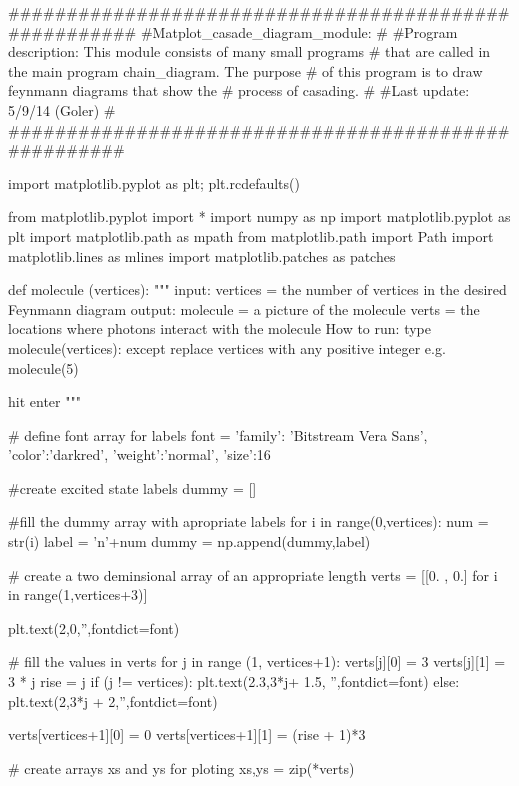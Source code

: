 \documentclass[11pt,a4paper,notitlepage]{article}
\begin{document}
\begin{code}
######################################################
#Matplot_casade_diagram_module:
#
#Program description: This module consists of many small programs 
#   that are called in the main program chain_diagram.  The purpose
#   of this program is to draw feynmann diagrams that show the 
#   process of casading.
#
#Last update: 5/9/14 (Goler)
#
#####################################################


import matplotlib.pyplot as plt; plt.rcdefaults()

from matplotlib.pyplot import *
import numpy as np
import matplotlib.pyplot as plt
import matplotlib.path as mpath
from matplotlib.path import Path
import matplotlib.lines as mlines
import matplotlib.patches as patches


def molecule (vertices):
    """
    input:
        vertices = the number of vertices in the desired Feynmann diagram
    output:
        molecule = a picture of the molecule
        verts = the locations where photons interact with the molecule
    How to run:
        type molecule(vertices): except replace vertices with any positive 
        integer e.g. molecule(5)
        
        hit enter
    """
    
    # define font array for labels
    font = {'family': 'Bitstream Vera Sans',
            'color':'darkred',
            'weight':'normal',
            'size':16}

    #create excited state labels       
    dummy = []
    
    #fill the dummy array with apropriate labels
    for i in range(0,vertices):
        num = str(i)
        label = 'n'+num
        dummy = np.append(dummy,label)
    
    # create a two deminsional array of an appropriate length
    verts = [[0. , 0.] for i in range(1,vertices+3)]
    
    plt.text(2,0,'',fontdict=font)
    
    # fill the values in verts
    for j in range (1, vertices+1):
        verts[j][0] = 3
        verts[j][1] = 3 * j
        rise = j  
        if (j != vertices):  
            plt.text(2.3,3*j+ 1.5, '',fontdict=font)
        else:
            plt.text(2,3*j + 2,'',fontdict=font)
            
    verts[vertices+1][0] = 0 
    verts[vertices+1][1] = (rise + 1)*3
       
    # create arrays xs and ys for ploting    
    xs,ys = zip(*verts)
    

\end{code}
\end{document}
